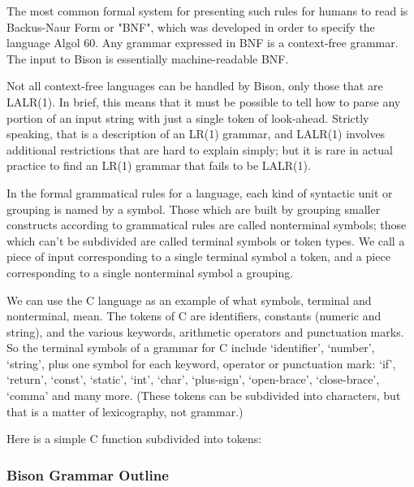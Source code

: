 The most common formal system for presenting such rules for humans to read is Backus-Naur Form or "BNF", which was developed in order to specify the language Algol 60. Any grammar expressed in BNF is a context-free grammar. The input to Bison is essentially machine-readable BNF.

Not all context-free languages can be handled by Bison, only those that are LALR(1). In brief, this means that it must be possible to tell how to parse any portion of an input string with just a single token of look-ahead. Strictly speaking, that is a description of an LR(1) grammar, and LALR(1) involves additional restrictions that are hard to explain simply; but it is rare in actual practice to find an LR(1) grammar that fails to be LALR(1).

In the formal grammatical rules for a language, each kind of syntactic unit or grouping is named by a symbol. Those which are built by grouping smaller constructs according to grammatical rules are called nonterminal symbols; those which can't be subdivided are called terminal symbols or token types. We call a piece of input corresponding to a single terminal symbol a token, and a piece corresponding to a single nonterminal symbol a grouping.

We can use the C language as an example of what symbols, terminal and nonterminal, mean. The tokens of C are identifiers, constants (numeric and string), and the various keywords, arithmetic operators and punctuation marks. So the terminal symbols of a grammar for C include `identifier', `number', `string', plus one symbol for each keyword, operator or punctuation mark: `if', `return', `const', `static', `int', `char', `plus-sign', `open-brace', `close-brace', `comma' and many more. (These tokens can be subdivided into characters, but that is a matter of lexicography, not grammar.)

Here is a simple C function subdivided into tokens:

\begin{file}[tokens.c]

\end{file}

\subsubsection{Bison Grammar Outline}

\begin{file}[bisonGrammar.y]
  
\end{file}


